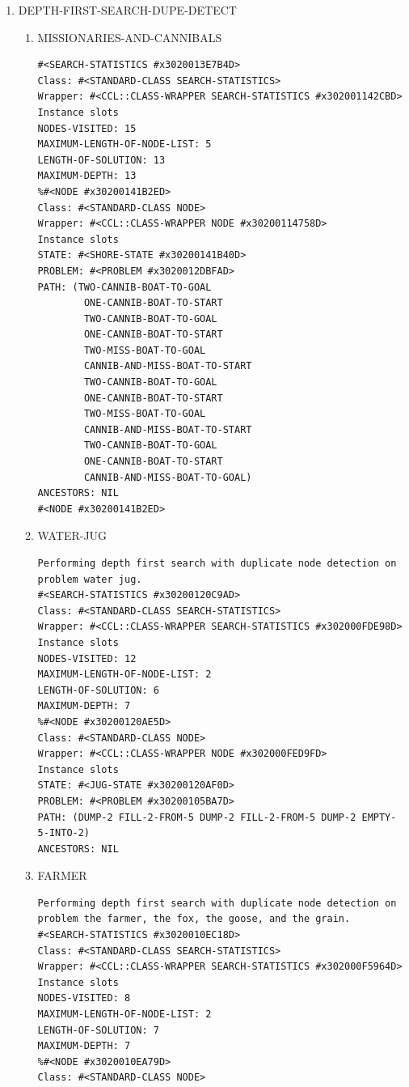 \documentclass[a4paper,6pt]{article}
\begin{document}
\begin{enumerate}
\item DEPTH-FIRST-SEARCH-DUPE-DETECT
\label{sec-1-2-2}
\begin{enumerate}
\item MISSIONARIES-AND-CANNIBALS
\label{sec-1-2-2-1}
\begin{verbatim}
#<SEARCH-STATISTICS #x3020013E7B4D>
Class: #<STANDARD-CLASS SEARCH-STATISTICS>
Wrapper: #<CCL::CLASS-WRAPPER SEARCH-STATISTICS #x302001142CBD>
Instance slots
NODES-VISITED: 15
MAXIMUM-LENGTH-OF-NODE-LIST: 5
LENGTH-OF-SOLUTION: 13
MAXIMUM-DEPTH: 13
%#<NODE #x30200141B2ED>
Class: #<STANDARD-CLASS NODE>
Wrapper: #<CCL::CLASS-WRAPPER NODE #x30200114758D>
Instance slots
STATE: #<SHORE-STATE #x30200141B40D>
PROBLEM: #<PROBLEM #x3020012DBFAD>
PATH: (TWO-CANNIB-BOAT-TO-GOAL
        ONE-CANNIB-BOAT-TO-START
        TWO-CANNIB-BOAT-TO-GOAL
        ONE-CANNIB-BOAT-TO-START
        TWO-MISS-BOAT-TO-GOAL
        CANNIB-AND-MISS-BOAT-TO-START
        TWO-CANNIB-BOAT-TO-GOAL
        ONE-CANNIB-BOAT-TO-START
        TWO-MISS-BOAT-TO-GOAL
        CANNIB-AND-MISS-BOAT-TO-START
        TWO-CANNIB-BOAT-TO-GOAL
        ONE-CANNIB-BOAT-TO-START
        CANNIB-AND-MISS-BOAT-TO-GOAL)
ANCESTORS: NIL
#<NODE #x30200141B2ED>
\end{verbatim}
\item WATER-JUG
\label{sec-1-2-2-2}
\begin{verbatim}
Performing depth first search with duplicate node detection on problem water jug.
#<SEARCH-STATISTICS #x30200120C9AD>
Class: #<STANDARD-CLASS SEARCH-STATISTICS>
Wrapper: #<CCL::CLASS-WRAPPER SEARCH-STATISTICS #x302000FDE98D>
Instance slots
NODES-VISITED: 12
MAXIMUM-LENGTH-OF-NODE-LIST: 2
LENGTH-OF-SOLUTION: 6
MAXIMUM-DEPTH: 7
%#<NODE #x30200120AE5D>
Class: #<STANDARD-CLASS NODE>
Wrapper: #<CCL::CLASS-WRAPPER NODE #x302000FED9FD>
Instance slots
STATE: #<JUG-STATE #x30200120AF0D>
PROBLEM: #<PROBLEM #x30200105BA7D>
PATH: (DUMP-2 FILL-2-FROM-5 DUMP-2 FILL-2-FROM-5 DUMP-2 EMPTY-5-INTO-2)
ANCESTORS: NIL
\end{verbatim}
\item FARMER
\label{sec-1-2-2-3}
\begin{verbatim}
Performing depth first search with duplicate node detection on 
problem the farmer, the fox, the goose, and the grain.
#<SEARCH-STATISTICS #x3020010EC18D>
Class: #<STANDARD-CLASS SEARCH-STATISTICS>
Wrapper: #<CCL::CLASS-WRAPPER SEARCH-STATISTICS #x302000F5964D>
Instance slots
NODES-VISITED: 8
MAXIMUM-LENGTH-OF-NODE-LIST: 2
LENGTH-OF-SOLUTION: 7
MAXIMUM-DEPTH: 7
%#<NODE #x3020010EA79D>
Class: #<STANDARD-CLASS NODE>

\end{verbatim}
\end{enumerate}
\end{enumerate}
\end{document}
